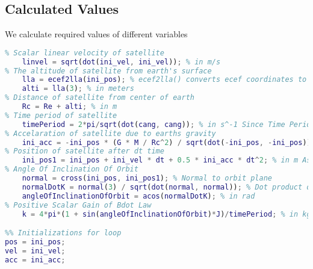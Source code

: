 \documentclass[11pt]{article}
\begin{document}
\subsection{Calculated Values}
We calculate required values of different variables
\begin{lstlisting}[language=MATLAB]
%% Calculated Values
% Scalar linear velocity of satellite
    linvel = sqrt(dot(ini_vel, ini_vel)); % in m/s
% The altitude of satellite from earth's surface
    lla = ecef2lla(ini_pos); % ecef2lla() converts ecef coordinates to latitude, longitude and altitude
    alti = lla(3); % in meters
% Distance of satellite from center of earth 
    Rc = Re + alti; % in m
% Time period of satellite
    timePeriod = 2*pi/sqrt(dot(cang, cang)); % in s^-1 Since Time Period = 2pi/(Angular Velocity)
% Accelaration of satellite due to earths gravity
    ini_acc = -ini_pos * (G * M / Rc^2) / sqrt(dot(-ini_pos, -ini_pos)); % in m/s^2 Since acceleration has value of GM/R^2 and in direction opposite to position vector
% Position of satellite after dt time
    ini_pos1 = ini_pos + ini_vel * dt + 0.5 * ini_acc * dt^2; % in m Assuming constant accelaration for dt time Since d = u*t + 0.5*a*t^2
% Angle Of Inclination Of Orbit
    normal = cross(ini_pos, ini_pos1); % Normal to orbit plane
    normalDotK = normal(3) / sqrt(dot(normal, normal)); % Dot product of unit normal vector with k^
    angleOfInclinationOfOrbit = acos(normalDotK); % in rad
% Positive Scalar Gain of Bdot Law
    k = 4*pi*(1 + sin(angleOfInclinationOfOrbit)*J)/timePeriod; % in kg*m^2*s Since k = 4*pi*(1+sin(angle of inclination))*Jmin/Torb

%% Initializations for loop
pos = ini_pos;
vel = ini_vel;
acc = ini_acc;
\end{lstlisting}
\end{document}
